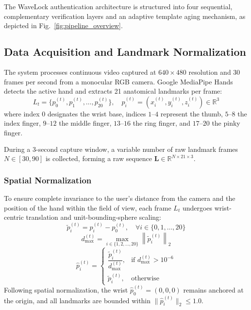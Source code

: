 \documentclass[conference]{IEEEtran}
\begin{document}
The WaveLock authentication architecture is structured into four sequential, complementary verification layers and an adaptive template aging mechanism, as depicted in Fig.~\ref{fig:pipeline_overview}.

\subsection{Data Acquisition and Landmark Normalization}

The system processes continuous video captured at $640 \times 480$ resolution and 30 frames per second from a monocular RGB camera. Google MediaPipe Hands~\cite{mediapipe} detects the active hand and extracts 21 anatomical landmarks per frame:
\begin{equation}
L_t = \{p_0^{(t)}, p_1^{(t)}, \ldots, p_{20}^{(t)}\}, \quad p_i^{(t)} = (x_i^{(t)}, y_i^{(t)}, z_i^{(t)}) \in \mathbb{R}^3
\end{equation}
where index $0$ designates the wrist base, indices $1\text{--}4$ represent the thumb, $5\text{--}8$ the index finger, $9\text{--}12$ the middle finger, $13\text{--}16$ the ring finger, and $17\text{--}20$ the pinky finger.

During a 3-second capture window, a variable number of raw landmark frames $N \in [30, 90]$ is collected, forming a raw sequence $\mathbf{L} \in \mathbb{R}^{N \times 21 \times 3}$.

\subsubsection{Spatial Normalization}
To ensure complete invariance to the user's distance from the camera and the position of the hand within the field of view, each frame $L_t$ undergoes wrist-centric translation and unit-bounding-sphere scaling:
\begin{equation}
\tilde{p}_i^{(t)} = p_i^{(t)} - p_0^{(t)}, \quad \forall i \in \{0, 1, \ldots, 20\}
\end{equation}
\begin{equation}
d_{\max}^{(t)} = \max_{i \in \{1, 2, \ldots, 20\}} \left\| \tilde{p}_i^{(t)} \right\|_2
\end{equation}
\begin{equation}
\hat{p}_i^{(t)} = \begin{cases}
\dfrac{\tilde{p}_i^{(t)}}{d_{\max}^{(t)}}, & \text{if } d_{\max}^{(t)} > 10^{-6} \\
\tilde{p}_i^{(t)}, & \text{otherwise}
\end{cases}
\label{eq:spatial_norm}
\end{equation}
Following spatial normalization, the wrist $\hat{p}_0^{(t)} = (0, 0, 0)$ remains anchored at the origin, and all landmarks are bounded within $\|\hat{p}_i^{(t)}\|_2 \le 1.0$.
\end{document}
